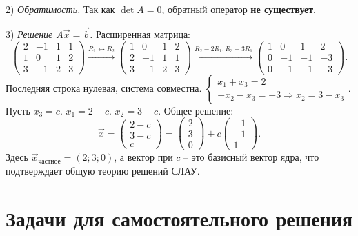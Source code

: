 \documentclass[12pt,a4paper]{article}
\theoremstyle{plain}
\theoremstyle{definition}
\begin{document}
\begin{solbox}
    2) \textit{Обратимость.}
    Так как $\det A = 0$, обратный оператор \textbf{не существует}.

    3) \textit{Решение $A\vec{x}=\vec{b}$.}
    Расширенная матрица:
    \[
    \left(\begin{array}{ccc|c} 2 & -1 & 1 & 1 \\ 1 & 0 & 1 & 2 \\ 3 & -1 & 2 & 3 \end{array}\right) \xrightarrow{R_1 \leftrightarrow R_2} \left(\begin{array}{ccc|c} 1 & 0 & 1 & 2 \\ 2 & -1 & 1 & 1 \\ 3 & -1 & 2 & 3 \end{array}\right) \xrightarrow{R_2-2R_1, R_3-3R_1} \left(\begin{array}{ccc|c} 1 & 0 & 1 & 2 \\ 0 & -1 & -1 & -3 \\ 0 & -1 & -1 & -3 \end{array}\right).
    \]
    Последняя строка нулевая, система совместна.
    $\begin{cases} x_1 + x_3 = 2 \\ -x_2 - x_3 = -3 \Rightarrow x_2 = 3 - x_3 \end{cases}$.
    Пусть $x_3 = c$.
    $x_1 = 2 - c$.
    $x_2 = 3 - c$.
    Общее решение:
    \[
    \vec{x} = \begin{pmatrix} 2 - c \\ 3 - c \\ c \end{pmatrix} = \begin{pmatrix} 2 \\ 3 \\ 0 \end{pmatrix} + c \begin{pmatrix} -1 \\ -1 \\ 1 \end{pmatrix}.
    \]
    Здесь $\vec{x}_{частное} = (2; 3; 0)$, а вектор при $c$ -- это базисный вектор ядра, что подтверждает общую теорию решений СЛАУ.
\end{solbox}

\vspace{0.3cm}

\section*{Задачи для самостоятельного решения}
\end{document}
